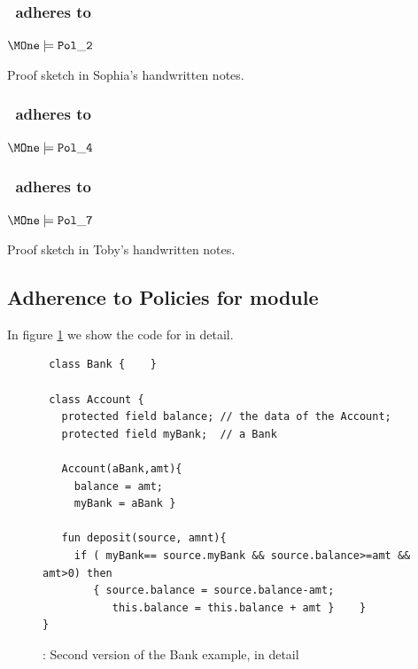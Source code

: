 \subsubsection{\MOne~adheres to }
\begin{lemma}
$\MOne \models \Pol 2$
\end{lemma}
Proof sketch   in Sophia's handwritten notes.

\subsubsection{\MOne~adheres to }

\begin{lemma}
$\MOne \models \Pol 4$
\end{lemma}

\subsubsection{\MOne~adheres to }

\begin{lemma}
$\MOne \models \Pol 7$
\end{lemma}
Proof sketch  in Toby's handwritten notes.

\subsection{Adherence to Policies for module \MTwo}
\label{section:Adherence:ModuleTwo}

In figure \ref{fig:BankDetailedTwo} we show the  code for \MTwo in detail.

\begin{figure}[tbp]
\begin{lstlisting}
 class Bank {    }

 class Account {
   protected field balance; // the data of the Account;
   protected field myBank;  // a Bank

   Account(aBank,amt){
     balance = amt;
     myBank = aBank }

   fun deposit(source, amnt){
     if ( myBank== source.myBank && source.balance>=amt && amt>0) then
        { source.balance = source.balance-amt;
           this.balance = this.balance + amt }    }
}

\end{lstlisting}
\caption{\MTwo: Second version of the Bank example, in detail}
\label{fig:BankDetailedTwo}
 \end{figure}

